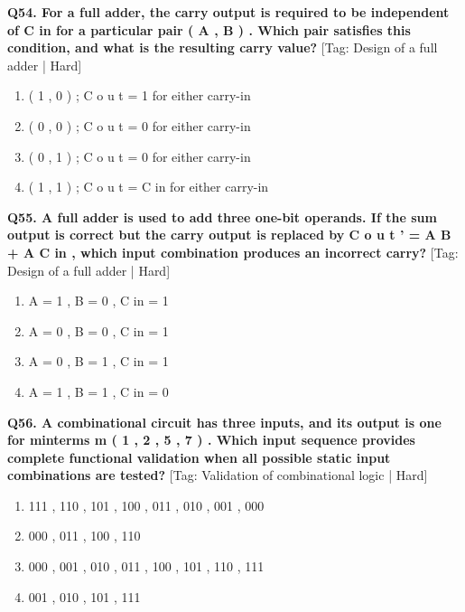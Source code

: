 \noindent\textbf{Q54. For a full adder, the carry output is required to be independent of C in for a particular pair ( A , B ) . Which pair satisfies this condition, and what is the resulting carry value?} \hfill [Tag: Design of a full adder | Hard]
\begin{enumerate}[label=(\alph*),topsep=2pt,itemsep=1pt,partopsep=0pt,parsep=0pt]
    \item {( 1 , 0 ) ; C o u t = 1 for either carry-in}
    \item {( 0 , 0 ) ; C o u t = 0 for either carry-in}
    \item {( 0 , 1 ) ; C o u t = 0 for either carry-in}
    \item {( 1 , 1 ) ; C o u t = C in for either carry-in}
\end{enumerate}
\vspace{2mm}

\noindent\textbf{Q55. A full adder is used to add three one-bit operands. If the sum output is correct but the carry output is replaced by C o u t ' = A B + A C in , which input combination produces an incorrect carry?} \hfill [Tag: Design of a full adder | Hard]
\begin{enumerate}[label=(\alph*),topsep=2pt,itemsep=1pt,partopsep=0pt,parsep=0pt]
    \item {A = 1 , B = 0 , C in = 1}
    \item {A = 0 , B = 0 , C in = 1}
    \item {A = 0 , B = 1 , C in = 1}
    \item {A = 1 , B = 1 , C in = 0}
\end{enumerate}
\vspace{2mm}

\noindent\textbf{Q56. A combinational circuit has three inputs, and its output is one for minterms m ( 1 , 2 , 5 , 7 ) . Which input sequence provides complete functional validation when all possible static input combinations are tested?} \hfill [Tag: Validation of combinational logic | Hard]
\begin{enumerate}[label=(\alph*),topsep=2pt,itemsep=1pt,partopsep=0pt,parsep=0pt]
    \item {111 , 110 , 101 , 100 , 011 , 010 , 001 , 000}
    \item {000 , 011 , 100 , 110}
    \item {000 , 001 , 010 , 011 , 100 , 101 , 110 , 111}
    \item {001 , 010 , 101 , 111}
\end{enumerate}
\vspace{2mm}

